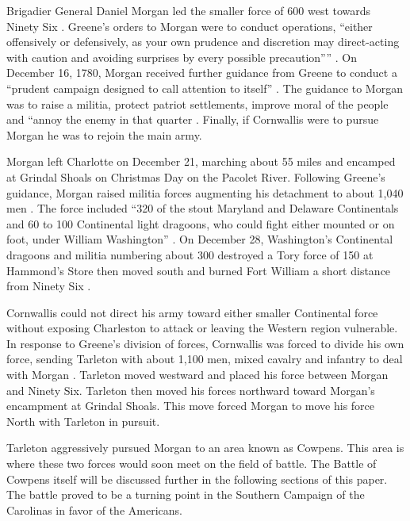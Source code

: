 Brigadier General Daniel Morgan led the smaller force of 600 west towards
Ninety Six \cite[27]{weigley_partisan_1970}.  Greene's orders to Morgan were to
conduct operations, ``either offensively or defensively, as your own prudence
and discretion may direct-acting with caution and avoiding surprises by every
possible precaution'''' \cite[27]{weigley_partisan_1970}.  On December 16,
1780, Morgan received further guidance from Greene to conduct a ``prudent
campaign designed to call attention to itself''
\cite[24]{moncure_cowpens_1996}.  The guidance to Morgan was to raise a
militia, protect patriot settlements, improve moral of the people and ``annoy
the enemy in that quarter \cite[24]{moncure_cowpens_1996}.  Finally, if
Cornwallis were to pursue Morgan he was to rejoin the main army.

Morgan left Charlotte on December 21, marching about 55 miles and encamped at
Grindal Shoals on Christmas Day on the Pacolet River.  Following Greene's
guidance, Morgan raised militia forces augmenting his detachment to about 1,040
men \cite[28]{weigley_partisan_1970}.   The force included ``320 of the stout Maryland and Delaware
Continentals and 60 to 100 Continental light dragoons, who could fight either
mounted or on foot, under William Washington'' \cite[28]{weigley_partisan_1970}.   On December 28,
Washington's Continental dragoons and militia numbering about 300 destroyed a
Tory force of 150 at Hammond's Store then moved south and burned Fort William a
short distance from Ninety Six
\cite[8]{babits_devil_2001}\cite[24]{moncure_cowpens_1996}.

Cornwallis could not direct his army toward either smaller Continental force
without exposing Charleston to attack or leaving the Western region vulnerable.
In response to Greene's division of forces, Cornwallis was forced to divide his
own force, sending Tarleton with about 1,100 men, mixed cavalry and infantry to
deal with Morgan \cite[28]{weigley_partisan_1970}.   Tarleton moved westward and placed his force
between Morgan and Ninety Six.  Tarleton then moved his forces northward toward
Morgan's encampment at Grindal Shoals.   This move forced Morgan to move his
force North with Tarleton in pursuit.  

Tarleton aggressively pursued Morgan to an area known as Cowpens.  This area is
where these two forces would soon meet on the field of battle.  The Battle of
Cowpens itself will be discussed further in the following sections of this
paper.  The battle proved to be a turning point in the Southern Campaign of the
Carolinas in favor of the Americans.

